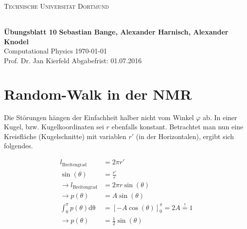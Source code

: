 
\usepackage{verbatim}
\usepackage{ulem}
\usepackage{braket}
\newcommand\OverfullCenter[1]{\noindent\makebox[\linewidth]{#1}}

\noindent
\centerline{\small{\textsc{Technische Universität Dortmund}}} \\
\large\textbf{Übungsblatt 10} \hfill \footnotesize\textbf{Sebastian Bange, Alexander Harnisch, Alexander Knodel} \\
\normalsize Computational Physics \hfill \today \\
Prof. Dr. Jan Kierfeld \hfill Abgabefrist: 01.07.2016\\
\noindent\makebox[\linewidth]{\rule{\textwidth}{0.4pt}}
\section*{Random-Walk in der NMR}
Die Störungen hängen der Einfachheit halber nicht vom Winkel $\varphi$ ab. In einer Kugel, bzw. Kugelkoordinaten sei $r$ ebenfalls konstant. Betrachtet man nun eine Kreisfläche (Kugelschnitte) mit variablen $r'$ (in der Horizontalen), ergibt sich folgendes.

\begin{align}
	l_{\text{Breitengrad}} &= 2\pi r' \\
	\sin(\theta) &= \frac{r'}{r} \\
	\rightarrow l_{\text{Breitengrad}} &= 2\pi r \sin(\theta) \\
	\rightarrow p(\theta) &= A \sin(\theta)\\
	\int_0^{\pi} p(\theta) \mathup{d\theta} &= \left[-A\cos(\theta)\right]_0^{\pi} = 2A \stackrel{!}{=} 1 \\
	\rightarrow p(\theta) &= \frac{1}{2} \sin(\theta)
\end{align}

